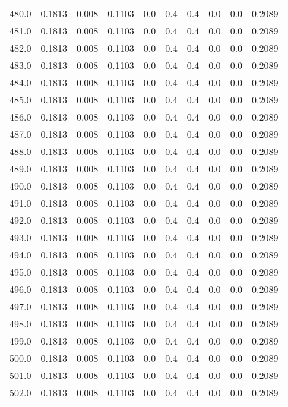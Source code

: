 \begin{longtable}{lrrrrrrrrr}
480.0 & 0.1813 & 0.008 & 0.1103 & 0.0 & 0.4 & 0.4 & 0.0 & 0.0 & 0.2089 \\
481.0 & 0.1813 & 0.008 & 0.1103 & 0.0 & 0.4 & 0.4 & 0.0 & 0.0 & 0.2089 \\
482.0 & 0.1813 & 0.008 & 0.1103 & 0.0 & 0.4 & 0.4 & 0.0 & 0.0 & 0.2089 \\
483.0 & 0.1813 & 0.008 & 0.1103 & 0.0 & 0.4 & 0.4 & 0.0 & 0.0 & 0.2089 \\
484.0 & 0.1813 & 0.008 & 0.1103 & 0.0 & 0.4 & 0.4 & 0.0 & 0.0 & 0.2089 \\
485.0 & 0.1813 & 0.008 & 0.1103 & 0.0 & 0.4 & 0.4 & 0.0 & 0.0 & 0.2089 \\
486.0 & 0.1813 & 0.008 & 0.1103 & 0.0 & 0.4 & 0.4 & 0.0 & 0.0 & 0.2089 \\
487.0 & 0.1813 & 0.008 & 0.1103 & 0.0 & 0.4 & 0.4 & 0.0 & 0.0 & 0.2089 \\
488.0 & 0.1813 & 0.008 & 0.1103 & 0.0 & 0.4 & 0.4 & 0.0 & 0.0 & 0.2089 \\
489.0 & 0.1813 & 0.008 & 0.1103 & 0.0 & 0.4 & 0.4 & 0.0 & 0.0 & 0.2089 \\
490.0 & 0.1813 & 0.008 & 0.1103 & 0.0 & 0.4 & 0.4 & 0.0 & 0.0 & 0.2089 \\
491.0 & 0.1813 & 0.008 & 0.1103 & 0.0 & 0.4 & 0.4 & 0.0 & 0.0 & 0.2089 \\
492.0 & 0.1813 & 0.008 & 0.1103 & 0.0 & 0.4 & 0.4 & 0.0 & 0.0 & 0.2089 \\
493.0 & 0.1813 & 0.008 & 0.1103 & 0.0 & 0.4 & 0.4 & 0.0 & 0.0 & 0.2089 \\
494.0 & 0.1813 & 0.008 & 0.1103 & 0.0 & 0.4 & 0.4 & 0.0 & 0.0 & 0.2089 \\
495.0 & 0.1813 & 0.008 & 0.1103 & 0.0 & 0.4 & 0.4 & 0.0 & 0.0 & 0.2089 \\
496.0 & 0.1813 & 0.008 & 0.1103 & 0.0 & 0.4 & 0.4 & 0.0 & 0.0 & 0.2089 \\
497.0 & 0.1813 & 0.008 & 0.1103 & 0.0 & 0.4 & 0.4 & 0.0 & 0.0 & 0.2089 \\
498.0 & 0.1813 & 0.008 & 0.1103 & 0.0 & 0.4 & 0.4 & 0.0 & 0.0 & 0.2089 \\
499.0 & 0.1813 & 0.008 & 0.1103 & 0.0 & 0.4 & 0.4 & 0.0 & 0.0 & 0.2089 \\
500.0 & 0.1813 & 0.008 & 0.1103 & 0.0 & 0.4 & 0.4 & 0.0 & 0.0 & 0.2089 \\
501.0 & 0.1813 & 0.008 & 0.1103 & 0.0 & 0.4 & 0.4 & 0.0 & 0.0 & 0.2089 \\
502.0 & 0.1813 & 0.008 & 0.1103 & 0.0 & 0.4 & 0.4 & 0.0 & 0.0 & 0.2089 \\

\end{longtable}
